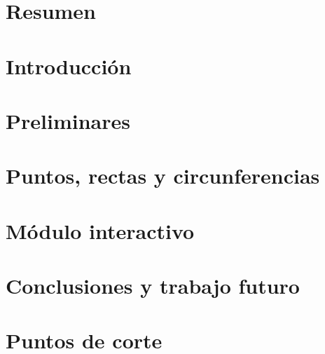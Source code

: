 \documentclass[12pt,a4paper]{book}
\begin{document}
\newcommand{\codesize}{\small}
%
\frontmatter

\chapter*{Resumen}

\tableofcontents

\mainmatter
\chapter{Introducción}\label{ch:intro}

\chapter{Preliminares}\label{cap.2}

\chapter{Puntos, rectas y circunferencias}\label{cap.3}

\chapter{Módulo interactivo}\label{cap.4}

\chapter{Conclusiones y trabajo futuro}\label{cap.5}

\appendix
\chapter{Puntos de corte}

\backmatter

\end{document}
